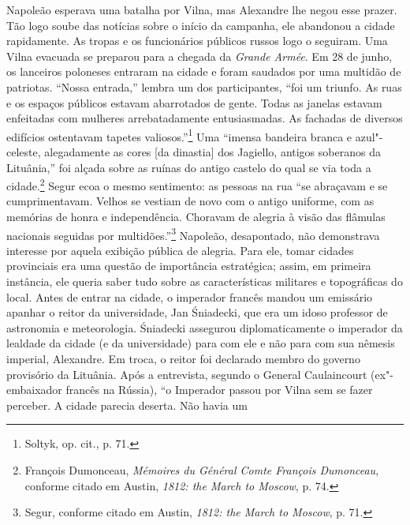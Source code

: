 %

Napoleão esperava uma batalha por Vilna, mas Alexandre lhe negou esse
prazer. Tão logo soube das notícias sobre o início da campanha, ele
abandonou a cidade rapidamente. As tropas e os funcionários públicos
russos logo o seguiram. Uma Vilna evacuada se preparou para a chegada da
\emph{Grande Armée}. Em 28 de junho, os lanceiros poloneses entraram na
cidade e foram saudados por uma multidão de patriotas. ``Nossa
entrada,'' lembra um dos participantes, ``foi um triunfo. As ruas e os
espaços públicos estavam abarrotados de gente. Todas as janelas estavam
enfeitadas com mulheres arrebatadamente entusiasmadas. As fachadas de
diversos edifícios ostentavam tapetes valiosos.''\footnote{Soltyk, op.
  cit., p. 71.} Uma ``imensa bandeira branca e azul"-celeste,
alegadamente as cores {[}da dinastia{]} dos Jagiello, antigos soberanos
da Lituânia,'' foi alçada sobre as ruínas do antigo castelo do qual se
via toda a cidade.\footnote{François Dumonceau, \emph{Mémoires du
  Général Comte François Dumonceau}, conforme citado em Austin,
  \emph{1812: the March to Moscow}, p. 74.} Segur ecoa o mesmo
sentimento: as pessoas na rua ``se abraçavam e se cumprimentavam. Velhos
se vestiam de novo com o antigo uniforme, com as memórias de honra e
independência. Choravam de alegria à visão das flâmulas nacionais
seguidas por multidões.''\footnote{Segur, conforme citado em Austin,
  \emph{1812: the March to Moscow}, p. 71.} Napoleão, desapontado, não
demonstrava interesse por aquela exibição pública de alegria. Para ele,
tomar cidades provinciais era uma questão de importância estratégica;
assim, em primeira instância, ele queria saber tudo sobre as
características militares e topográficas do local. Antes de entrar na
cidade, o imperador francês mandou um emissário apanhar o reitor da
universidade, Jan Śniadecki, que era um idoso professor de astronomia e
meteorologia. Śniadecki assegurou diplomaticamente o imperador da
lealdade da cidade (e da universidade) para com ele e não para com sua
nêmesis imperial, Alexandre. Em troca, o reitor foi declarado membro do
governo provisório da Lituânia. Após a entrevista, segundo o General
Caulaincourt (ex"-embaixador francês na Rússia), ``o Imperador passou por
Vilna sem se fazer perceber. A cidade parecia deserta. Não havia um
